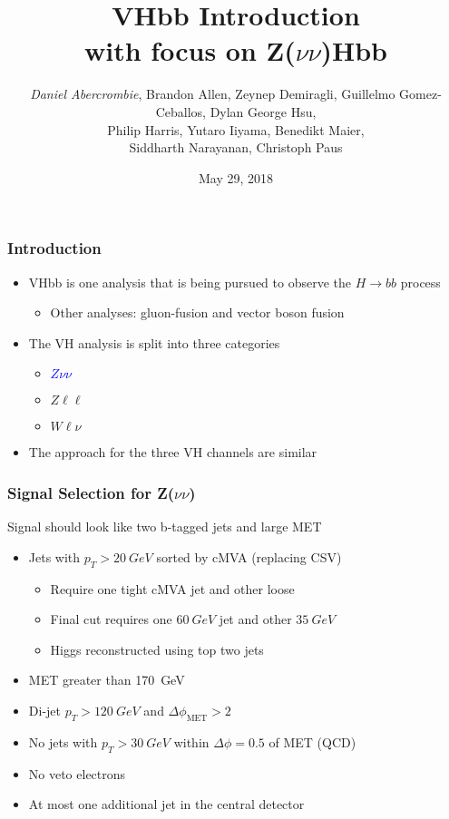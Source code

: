 \documentclass{beamer}
\author[D. Abercrombie]{
  \emph{Daniel Abercrombie}, Brandon Allen, Zeynep Demiragli,
  Guillelmo Gomez-Ceballos, Dylan George Hsu, \\
  Philip Harris, Yutaro Iiyama, Benedikt Maier, \\
  Siddharth Narayanan, Christoph Paus
}
\title{\bf \sffamily VHbb Introduction \\ with focus on Z($\nu\nu$)Hbb}
\date{May 29, 2018}
\begin{document}
\begin{frame}[nonumbering]
  \titlepage
\end{frame}

\begin{frame}
  \frametitle{Introduction}
  \begin{itemize}
  \item VHbb is one analysis that is being pursued to observe the $H \rightarrow bb$ process
    \begin{itemize}
    \item Other analyses: gluon-fusion and vector boson fusion
    \end{itemize}
  \item The VH analysis is split into three categories
    \begin{itemize}
    \item \textcolor{blue}{$Z\nu\nu$}
    \item $Z\ell\ell$
    \item $W\ell\nu$
    \end{itemize}
  \item The approach for the three VH channels are similar
  \end{itemize}
\end{frame}

\begin{frame}
  \frametitle{Signal Selection for Z($\nu\nu$)}
  Signal should look like two b-tagged jets and large MET
  \begin{itemize}
  \item Jets with $p_T > \SI{20}{GeV}$ sorted by cMVA (replacing CSV)
    \begin{itemize}
    \item Require one tight cMVA jet and other loose
    \item Final cut requires one $\SI{60}{GeV}$ jet and other $\SI{35}{GeV}$
    \item Higgs reconstructed using top two jets
    \end{itemize}
  \item MET greater than \SI{170}{GeV}
  \item Di-jet $p_T > \SI{120}{GeV}$ and $\Delta\phi_{\mathrm{MET}} > 2$
  \item No jets with $p_T > \SI{30}{GeV}$ within $\Delta\phi = 0.5$ of MET (QCD)
  \item No veto electrons
  \item At most one additional jet in the central detector
  \end{itemize}
\end{frame}
\end{document}
